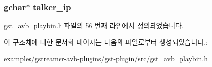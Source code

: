\subsubsection[{\texorpdfstring{talker\+\_\+ip}{talker_ip}}]{\setlength{\rightskip}{0pt plus 5cm}gchar$\ast$ talker\+\_\+ip}\hypertarget{struct___gst_a_v_b_src_a917022df7bed008cf4778d3ecd14ffc1}{}\label{struct___gst_a_v_b_src_a917022df7bed008cf4778d3ecd14ffc1}


gst\+\_\+avb\+\_\+playbin.\+h 파일의 56 번째 라인에서 정의되었습니다.



이 구조체에 대한 문서화 페이지는 다음의 파일로부터 생성되었습니다.\+:\begin{DoxyCompactItemize}
\item 
examples/gstreamer-\/avb-\/plugins/gst-\/plugin/src/\hyperlink{gst__avb__playbin_8h}{gst\+\_\+avb\+\_\+playbin.\+h}\end{DoxyCompactItemize}
